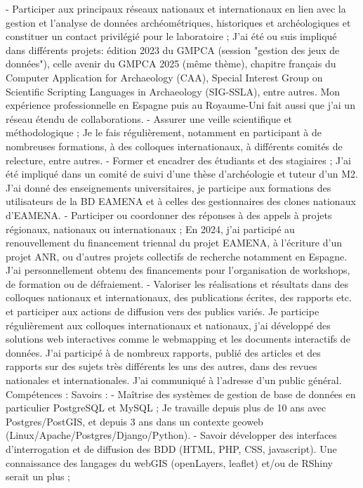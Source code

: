 - Participer aux principaux réseaux nationaux et internationaux en lien avec la gestion et l'analyse de données
archéométriques, historiques et archéologiques et constituer un contact privilégié pour le laboratoire ;
J'ai été ou suis impliqué dans différents projets: édition 2023 du GMPCA (session "gestion des jeux de données"),
celle avenir du GMPCA 2025 (même thème), chapitre français du Computer Application for Archaeology (CAA), Special
Interest Group on Scientific Scripting Languages in Archaeology (SIG-SSLA), entre autres. Mon expérience professionnelle en
Espagne puis au Royaume-Uni fait aussi que j'ai un réseau étendu de collaborations.
- Assurer une veille scientifique et méthodologique ;
Je le fais régulièrement, notamment en participant à de nombreuses formations, à des colloques internationaux, à
différents comités de relecture, entre autres.
- Former et encadrer des étudiants et des stagiaires ;
J'ai été impliqué dans un comité de suivi d'une thèse d'archéologie et tuteur d'un M2. J'ai donné des enseignements
universitaires, je participe aux formations des utilisateurs de la BD EAMENA et à celles des gestionnaires des clones nationaux
d'EAMENA.
- Participer ou coordonner des réponses à des appels à projets régionaux, nationaux ou internationaux ;
En 2024, j'ai participé au renouvellement du financement triennal du projet EAMENA, à l'écriture d'un projet ANR, ou
d'autres projets collectifs de recherche notamment en Espagne. J'ai personnellement obtenu des financements pour
l'organisation de workshops, de formation ou de défraiement.
- Valoriser les réalisations et résultats dans des colloques nationaux et internationaux, des publications écrites, des
rapports etc. et participer aux actions de diffusion vers des publics variés.
Je participe régulièrement aux colloques internationaux et nationaux, j'ai développé des solutions web interactives
comme le webmapping et les documents interactifs de données. J'ai participé à de nombreux rapports, publié des articles
et des rapports sur des sujets très différents les uns des autres, dans des revues nationales et internationales. J'ai
communiqué à l'adresse d'un public général.
Compétences :
Savoirs :
- Maîtrise des systèmes de gestion de base de données en particulier PostgreSQL et MySQL ;
Je travaille depuis plus de 10 ans avec Postgres/PostGIS, et depuis 3 ans dans un contexte geoweb
(Linux/Apache/Postgres/Django/Python).
- Savoir développer des interfaces d'interrogation et de diffusion des BDD (HTML, PHP, CSS, javascript). Une connaissance
des langages du webGIS (openLayers, leaflet) et/ou de RShiny serait un plus ;

